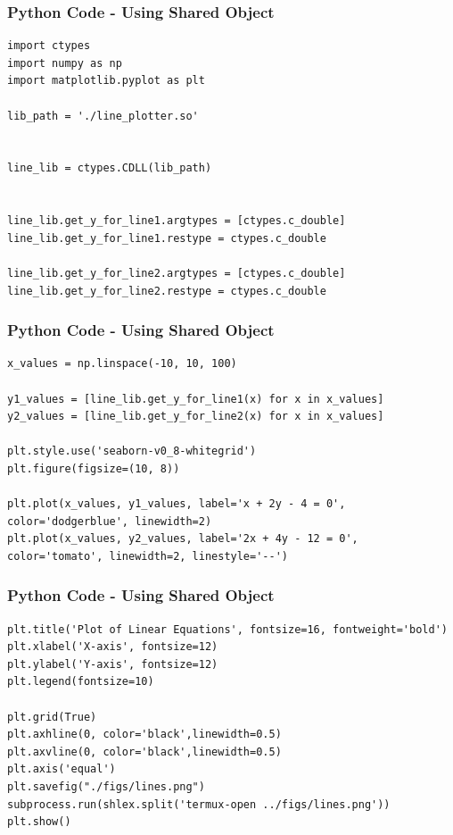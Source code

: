 \documentclass{beamer}
\begin{document}
\begin{frame}[fragile]
    \frametitle{Python Code - Using Shared Object}
    \begin{lstlisting}
import ctypes
import numpy as np
import matplotlib.pyplot as plt

lib_path = './line_plotter.so'


line_lib = ctypes.CDLL(lib_path)


line_lib.get_y_for_line1.argtypes = [ctypes.c_double]
line_lib.get_y_for_line1.restype = ctypes.c_double

line_lib.get_y_for_line2.argtypes = [ctypes.c_double]
line_lib.get_y_for_line2.restype = ctypes.c_double
\end{lstlisting}
\end{frame}

\begin{frame}[fragile]
    \frametitle{Python Code - Using Shared Object}
    \begin{lstlisting}
x_values = np.linspace(-10, 10, 100)

y1_values = [line_lib.get_y_for_line1(x) for x in x_values]
y2_values = [line_lib.get_y_for_line2(x) for x in x_values]

plt.style.use('seaborn-v0_8-whitegrid')
plt.figure(figsize=(10, 8))

plt.plot(x_values, y1_values, label='x + 2y - 4 = 0', color='dodgerblue', linewidth=2)
plt.plot(x_values, y2_values, label='2x + 4y - 12 = 0', color='tomato', linewidth=2, linestyle='--')
\end{lstlisting}
\end{frame}
\begin{frame}[fragile]
    \frametitle{Python Code - Using Shared Object}
    \begin{lstlisting}
plt.title('Plot of Linear Equations', fontsize=16, fontweight='bold')
plt.xlabel('X-axis', fontsize=12)
plt.ylabel('Y-axis', fontsize=12)
plt.legend(fontsize=10)

plt.grid(True)
plt.axhline(0, color='black',linewidth=0.5)
plt.axvline(0, color='black',linewidth=0.5)
plt.axis('equal')
plt.savefig("./figs/lines.png") 
subprocess.run(shlex.split('termux-open ../figs/lines.png'))
plt.show()
\end{lstlisting}
\end{frame}
\end{document}

